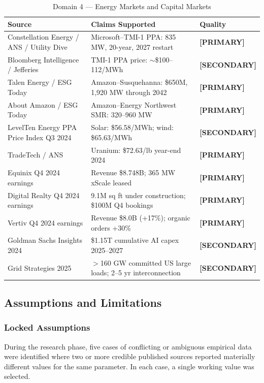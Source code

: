 \documentclass{article}
\newcommand{\PRIMARY}{\textbf{[PRIMARY]}}
\newcommand{\SECONDARY}{\textbf{[SECONDARY]}}
\begin{document}
\begin{table}[ht]
\centering
\caption{Domain 4 --- Energy Markets and Capital Markets}
\label{tab:domain4}
\small
\begin{tabular}{@{}p{4.5cm}p{3.5cm}p{1.5cm}@{}}
\toprule
\textbf{Source} & \textbf{Claims Supported} & \textbf{Quality} \\
\midrule
Constellation Energy / ANS / Utility Dive & Microsoft--TMI-1 PPA: 835 MW, 20-year, 2027 restart & \PRIMARY{} \\
Bloomberg Intelligence / Jefferies & TMI-1 PPA price: $\sim$\$100--112/MWh & \SECONDARY{} \\
Talen Energy / ESG Today & Amazon--Susquehanna: \$650M, 1,920 MW through 2042 & \PRIMARY{} \\
About Amazon / ESG Today & Amazon--Energy Northwest SMR: 320--960 MW & \PRIMARY{} \\
LevelTen Energy PPA Price Index Q3 2024 & Solar: \$56.58/MWh; wind: \$65.63/MWh & \SECONDARY{} \\
TradeTech / ANS & Uranium: \$72.63/lb year-end 2024 & \PRIMARY{} \\
Equinix Q4 2024 earnings & Revenue \$8.748B; 365 MW xScale leased & \PRIMARY{} \\
Digital Realty Q4 2024 earnings & 9.1M sq ft under construction; \$100M Q4 bookings & \PRIMARY{} \\
Vertiv Q4 2024 earnings & Revenue \$8.0B (+17\%); organic orders +30\% & \PRIMARY{} \\
Goldman Sachs Insights 2024 & \$1.15T cumulative AI capex 2025--2027 & \SECONDARY{} \\
Grid Strategies 2025 & $>$160 GW committed US large loads; 2--5 yr interconnection & \SECONDARY{} \\
\bottomrule
\end{tabular}
\end{table}

\subsection{Assumptions and Limitations}
\label{sec:assumptions}

\subsubsection{Locked Assumptions}

During the research phase, five cases of conflicting or ambiguous empirical data were
identified where two or more credible published sources reported materially different
values for the same parameter. In each case, a single working value was selected.
\end{document}
